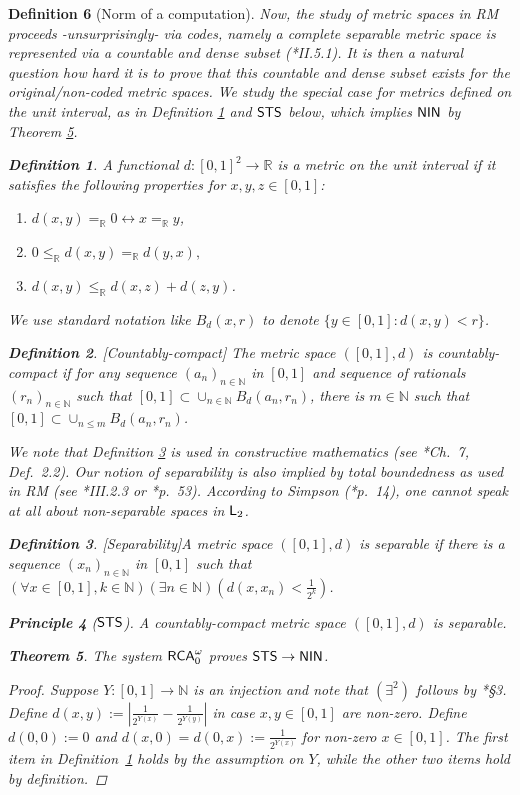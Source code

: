 \documentclass[reqno]{amsart}
\newtheorem{thm}{Theorem}
\newtheorem{defi}[thm]{Definition}
\newtheorem{princ}[thm]{Principle}
\def\bdefi{\begin{defi}\rm}
\def\edefi{\end{defi}}
\def\RCAo{\textup{\textsf{RCA}}_{0}^{\omega}}
\def\N{{\mathbb  N}}
\def\R{{\mathbb  R}}
\def\L{\textsf{\textup{L}}}
\def\di{\rightarrow}
\def\asa{\leftrightarrow}
\def\STS{\textup{\textsf{STS}}}
\def\NIN{\textup{\textsf{NIN}}}
\numberwithin{equation}{section}
\numberwithin{thm}{section}
\begin{document}
\begin{defi}[Norm of a computation]
Now, the study of metric spaces in RM proceeds -unsurprisingly- via codes, namely a complete separable metric space is represented via a countable and dense subset (\cite{simpson2}*{II.5.1}). 
It is then a natural question how hard it is to prove that this countable and dense subset exists for the original/non-coded metric spaces. 
We study the special case for metrics \emph{defined on the unit interval}, as in Definition \ref{donc} and $\STS$ below, which implies $\NIN$ by Theorem \ref{STS}.  
\bdefi\label{donc}
A functional $d: [0,1]^{2}\di \R$ is a \emph{metric on the unit interval} if it satisfies the following properties for $x, y, z\in [0,1]$:
\begin{enumerate}
 \renewcommand{\theenumi}{\alph{enumi}}
\item $d(x, y)=_{\R}0 \asa  x=_{\R}y$,
\item $0\leq_{\R} d(x, y)=_{\R}d(y, x), $
\item $d(x, y)\leq_{\R} d(x, z)+ d(z, y)$.
\end{enumerate}
We use standard notation like $B_{d}(x, r)$ to denote $\{y\in [0,1]: d(x, y)<r\}$.
\edefi
\bdefi[Countably-compact]
The metric space $([0,1], d)$ is \emph{countably-compact} if for any sequence $(a_{n})_{n\in \N}$ in $[0,1]$ and sequence of rationals $(r_{n})_{n\in \N}$ such that $[0,1]\subset \cup_{n\in \N}B_{d}(a_{n}, r_{n})$, there is $m\in \N$ such that  $[0,1]\subset \cup_{n\leq m}B_{d}(a_{n}, r_{n})$.
\edefi
We note that Definition \ref{SEPKE} is used in constructive mathematics (see \cite{troeleke2}*{Ch.\ 7, Def.\ 2.2}).  
Our notion of separability is also implied by \emph{total boundedness} as used in RM (see \cite{simpson2}*{III.2.3} or \cite{browner}*{p.\ 53}).
According to Simpson (\cite{simpson2}*{p.\ 14}), one cannot speak at all about non-separable spaces in $\L_{2}$.  
\bdefi[Separability]\label{SEPKE}
A metric space $([0,1], d)$ is \emph{separable} if there is a sequence $(x_{n})_{n\in \N}$ in $[0,1]$ such that $(\forall x\in [0,1], k\in \N)(\exists n\in \N)( d(x, x_{n})<\frac{1}{2^{k}})$.
\edefi
\begin{princ}[$\STS$]
A countably-compact metric space $([0,1], d)$ is separable.
\end{princ}
\begin{thm}\label{STS}
The system $\RCAo$ proves $\STS\di \NIN$.
\end{thm}
\begin{proof}
Suppose $Y:[0,1]\di \N$ is an injection and note that $(\exists^{2})$ follows by \cite{kohlenbach2}*{\S3}.  
Define $d(x, y):=|\frac{1}{2^{Y(x)}}-\frac{1}{2^{Y(y)}}|$ in case $x, y\in [0,1]$ are non-zero.  Define $d(0, 0):=0$ and $d(x, 0)= d(0, x):= \frac{1}{2^{Y(x)}}$ for non-zero $x\in [0,1]$.
The first item in Definition~\ref{donc} holds by the assumption on $Y$, while the other two items hold by definition. 


\end{proof}
\end{defi}
\end{document}
